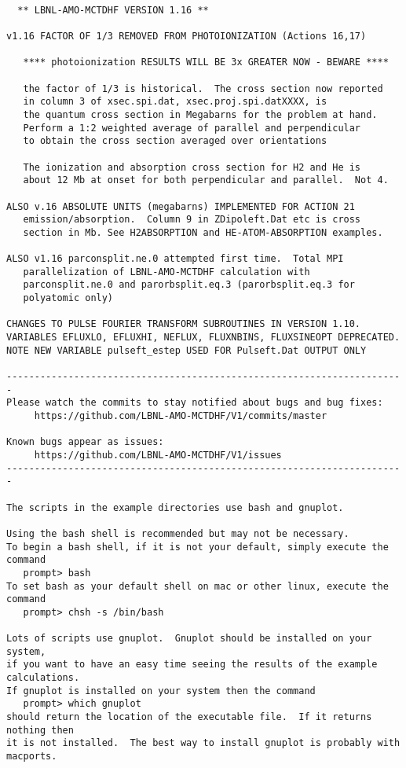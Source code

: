\begin{verbatim}

  ** LBNL-AMO-MCTDHF VERSION 1.16 **

v1.16 FACTOR OF 1/3 REMOVED FROM PHOTOIONIZATION (Actions 16,17)

   **** photoionization RESULTS WILL BE 3x GREATER NOW - BEWARE ****

   the factor of 1/3 is historical.  The cross section now reported
   in column 3 of xsec.spi.dat, xsec.proj.spi.datXXXX, is
   the quantum cross section in Megabarns for the problem at hand.
   Perform a 1:2 weighted average of parallel and perpendicular
   to obtain the cross section averaged over orientations

   The ionization and absorption cross section for H2 and He is 
   about 12 Mb at onset for both perpendicular and parallel.  Not 4.

ALSO v.16 ABSOLUTE UNITS (megabarns) IMPLEMENTED FOR ACTION 21
   emission/absorption.  Column 9 in ZDipoleft.Dat etc is cross 
   section in Mb. See H2ABSORPTION and HE-ATOM-ABSORPTION examples.

ALSO v1.16 parconsplit.ne.0 attempted first time.  Total MPI 
   parallelization of LBNL-AMO-MCTDHF calculation with
   parconsplit.ne.0 and parorbsplit.eq.3 (parorbsplit.eq.3 for 
   polyatomic only)

CHANGES TO PULSE FOURIER TRANSFORM SUBROUTINES IN VERSION 1.10.
VARIABLES EFLUXLO, EFLUXHI, NEFLUX, FLUXNBINS, FLUXSINEOPT DEPRECATED.
NOTE NEW VARIABLE pulseft_estep USED FOR Pulseft.Dat OUTPUT ONLY

-----------------------------------------------------------------------
Please watch the commits to stay notified about bugs and bug fixes:
     https://github.com/LBNL-AMO-MCTDHF/V1/commits/master

Known bugs appear as issues:
     https://github.com/LBNL-AMO-MCTDHF/V1/issues
-----------------------------------------------------------------------

The scripts in the example directories use bash and gnuplot.  

Using the bash shell is recommended but may not be necessary.
To begin a bash shell, if it is not your default, simply execute the command
   prompt> bash
To set bash as your default shell on mac or other linux, execute the command
   prompt> chsh -s /bin/bash

Lots of scripts use gnuplot.  Gnuplot should be installed on your system,
if you want to have an easy time seeing the results of the example calculations.
If gnuplot is installed on your system then the command
   prompt> which gnuplot
should return the location of the executable file.  If it returns nothing then
it is not installed.  The best way to install gnuplot is probably with macports.


\end{verbatim}
